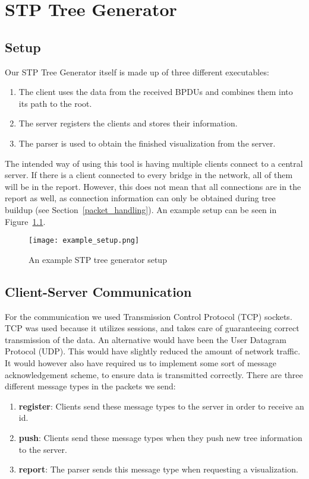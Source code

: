 \chapter{STP Tree Generator}
\label{stp_gen}
\section{Setup}
Our STP Tree Generator itself is made up of three different executables:
\begin{enumerate}
    \item The client uses the data from the received BPDUs and combines them into its path to the root.
    \item The server registers the clients and stores their information.
    \item The parser is used to obtain the finished visualization from the server.
\end{enumerate}
The intended way of using this tool is having multiple clients connect to a central server.
If there is a client connected to every bridge in the network, all of them will be in the report.
However, this does not mean that all connections are in the report as well, as connection information can only be obtained during tree buildup (see Section~\ref{packet_handling}).
An example setup can be seen in Figure~\ref{fig:example_setup}.

\begin{figure}[h]
    \centering
    \texttt{[image: example\_setup.png]}
    \caption{An example STP tree generator setup}
    \label{fig:example_setup}
\end{figure}

\section{Client-Server Communication}
For the communication we used Transmission Control Protocol (TCP) sockets.
TCP was used because it utilizes sessions, and takes care of guaranteeing correct transmission of the data.
An alternative would have been the User Datagram Protocol (UDP).
This would have slightly reduced the amount of network traffic.
It would however also have required us to implement some sort of message acknowledgement scheme, to ensure data is transmitted correctly.
There are three different message types in the packets we send:
\begin{enumerate}
    \item \textbf{register}: Clients send these message types to the server in order to receive an id.
    \item \textbf{push}: Clients send these message types when they push new tree information to the server.
    \item \textbf{report}: The parser sends this message type when requesting a visualization.
\end{enumerate}

